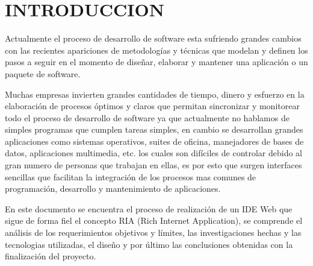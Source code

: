 \section{INTRODUCCION}

Actualmente el proceso de desarrollo de software esta sufriendo grandes cambios con las recientes apariciones de metodologías y técnicas que modelan y definen los pasos a seguir en el momento de diseñar, elaborar y mantener una aplicación o un paquete de software.

Muchas empresas invierten grandes cantidades de tiempo, dinero y esfuerzo en la elaboración de procesos óptimos y claros que permitan sincronizar y monitorear todo el proceso de desarrollo de software ya que actualmente no hablamos de simples programas que cumplen tareas simples, en cambio se desarrollan grandes aplicaciones como sistemas operativos, suites de oficina, manejadores de bases de datos, aplicaciones multimedia, etc. los cuales son difíciles de controlar debido al gran numero de personas que trabajan en ellas, es por esto que surgen interfaces sencillas que facilitan la integración de los procesos mas comunes de programación, desarrollo y mantenimiento de aplicaciones.

En este documento se encuentra el proceso de realización de un IDE Web que sigue de forma fiel el concepto RIA (Rich Internet Application), se comprende el análisis de los requerimientos objetivos y límites, las investigaciones hechas y las tecnologias utilizadas, el diseño y por último las conclusiones obtenidas con la finalización del proyecto.
